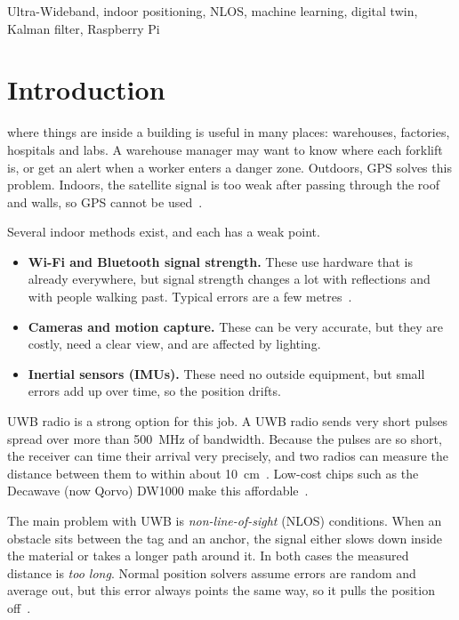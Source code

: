 \documentclass[conference]{IEEEtran}
\begin{document}
\begin{IEEEkeywords}
Ultra-Wideband, indoor positioning, NLOS, machine learning, digital twin, Kalman filter, Raspberry Pi
\end{IEEEkeywords}

\section{Introduction}
 where things are inside a building is useful in
many places: warehouses, factories, hospitals and labs. A warehouse manager
may want to know where each forklift is, or get an alert when a worker
enters a danger zone. Outdoors, GPS solves this problem. Indoors, the
satellite signal is too weak after passing through the roof and walls, so
GPS cannot be used~\cite{zafari2019survey}.

Several indoor methods exist, and each has a weak point.
\begin{itemize}
    \item \textbf{Wi-Fi and Bluetooth signal strength.} These use hardware
    that is already everywhere, but signal strength changes a lot with
    reflections and with people walking past. Typical errors are a few
    metres~\cite{zafari2019survey}.
    \item \textbf{Cameras and motion capture.} These can be very accurate,
    but they are costly, need a clear view, and are affected by lighting.
    \item \textbf{Inertial sensors (IMUs).} These need no outside
    equipment, but small errors add up over time, so the position drifts.
\end{itemize}

UWB radio is a strong option for this job. A UWB radio sends very short
pulses spread over more than 500~MHz of bandwidth. Because the pulses are
so short, the receiver can time their arrival very precisely, and two radios
can measure the distance between them to within about
10~cm~\cite{gezici2005localization,jimenez2017comparing}. Low-cost chips
such as the Decawave (now Qorvo) DW1000 make this affordable~\cite{dw1000usermanual}.

The main problem with UWB is \emph{non-line-of-sight} (NLOS) conditions.
When an obstacle sits between the tag and an anchor, the signal either
slows down inside the material or takes a longer path around it. In both
cases the measured distance is \emph{too long}. Normal position solvers
assume errors are random and average out, but this error always points the
same way, so it pulls the position off~\cite{guvenc2009survey}.
\end{document}
